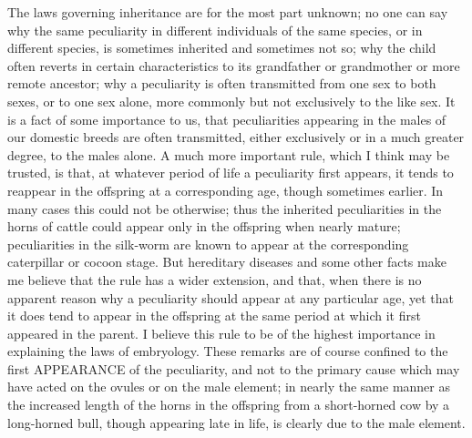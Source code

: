 The laws governing inheritance are for the most part unknown; no
one can say why the same peculiarity in different individuals of
the same species, or in different species, is sometimes inherited
and sometimes not so; why the child often reverts in certain
characteristics to its grandfather or grandmother or more remote
ancestor; why a peculiarity is often transmitted from one sex to
both sexes, or to one sex alone, more commonly but not exclusively
to the like sex. It is a fact of some importance to us, that
peculiarities appearing in the males of our domestic breeds are
often transmitted, either exclusively or in a much greater degree,
to the males alone. A much more important rule, which I think may
be trusted, is that, at whatever period of life a peculiarity first
appears, it tends to reappear in the offspring at a corresponding
age, though sometimes earlier. In many cases this could not be
otherwise; thus the inherited peculiarities in the horns of cattle
could appear only in the offspring when nearly mature;
peculiarities in the silk-worm are known to appear at the
corresponding caterpillar or cocoon stage. But hereditary diseases
and some other facts make me believe that the rule has a wider
extension, and that, when there is no apparent reason why a
peculiarity should appear at any particular age, yet that it does
tend to appear in the offspring at the same period at which it
first appeared in the parent. I believe this rule to be of the
highest importance in explaining the laws of embryology. These
remarks are of course confined to the first APPEARANCE of the
peculiarity, and not to the primary cause which may have acted on
the ovules or on the male element; in nearly the same manner as the
increased length of the horns in the offspring from a short-horned
cow by a long-horned bull, though appearing late in life, is
clearly due to the male element.

